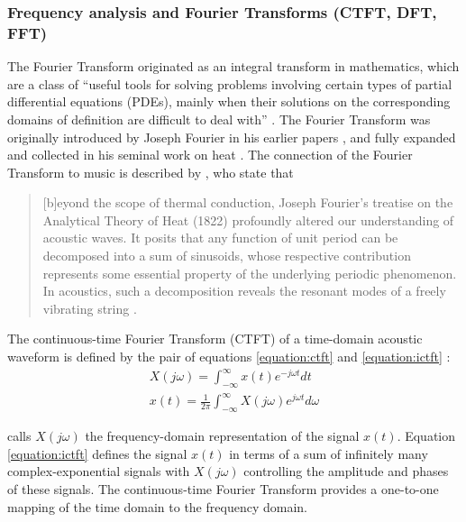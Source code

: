 \documentclass[report.tex]{subfiles}
\begin{document}
\subsubsection{Frequency analysis and Fourier Transforms (CTFT, DFT, FFT)}
\label{sec:freqanal}

The Fourier Transform originated as an integral transform in mathematics, which are a class of ``useful tools for solving problems involving certain types of partial differential equations (PDEs), mainly when their solutions on the corresponding domains of definition are difficult to deal with'' \parencite[54]{fourierhistory}. The Fourier Transform was originally introduced by Joseph Fourier in his earlier papers \parencite{fourierhist1, fourierhist2}, and fully expanded and collected in his seminal work on heat \parencite{fourierheat}. The connection of the Fourier Transform to music is described by \citeauthor{fouriermusic}, who state that

\begin{quote}
	[b]eyond the scope of thermal conduction, Joseph Fourier's treatise on the Analytical Theory of Heat (1822) profoundly altered our understanding of acoustic waves. It posits that any function of unit period can be decomposed into a sum of sinusoids, whose respective contribution represents some essential property of the underlying periodic phenomenon. In acoustics, such a decomposition reveals the resonant modes of a freely vibrating string \parencite[461]{fouriermusic}.
\end{quote}

The continuous-time Fourier Transform (CTFT) of a time-domain acoustic waveform is defined by the pair of equations \eqref{equation:ctft} and \eqref{equation:ictft} \parencite[308]{dspfirst}:
\begin{align}
	X(j\omega) = \int_{-\infty}^{\infty}{x(t)e^{-j\omega t}\mathit{dt}} \tag{1}\label{equation:ctft} \\
	x(t) = \frac{1}{2\pi}\int_{-\infty}^{\infty}{X(j\omega)e^{j\omega t}\mathit{d\omega}} \tag{2}\label{equation:ictft}
\end{align}

\textcite{dspfirst} calls $X(j\omega)$ the frequency-domain representation of the signal $x(t)$. Equation \eqref{equation:ictft} defines the signal $x(t)$ in terms of a sum of infinitely many complex-exponential signals with $X(j\omega)$ controlling the amplitude and phases of these signals. The continuous-time Fourier Transform provides a one-to-one mapping of the time domain to the frequency domain.
\end{document}
